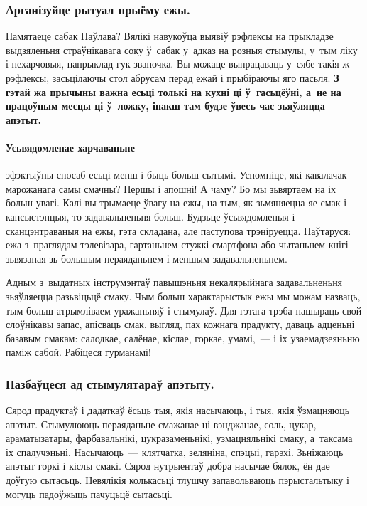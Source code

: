 \subsubsection{Арганізуйце рытуал прыёму ежы.}
Памятаеце сабак Паўлава? Вялікі навукоўца выявіў рэфлексы на прыкладзе выдзяленьня страўнікавага соку ў~сабак у~адказ на розныя стымулы, у~тым ліку і нехарчовыя, напрыклад гук званочка. Вы можаце выпрацаваць у~сябе такія ж рэфлексы, засьцілаючы стол абрусам перад ежай і прыбіраючы яго пасьля. \textbf{З гэтай жа прычыны важна есьці толькі на кухні ці ў~гасьцёўні, а~не на працоўным месцы ці ў~ложку, інакш там будзе ўвесь час зьяўляцца апэтыт.}

\paragraph{Усьвядомленае харчаваньне~---} эфэктыўны спосаб есьці менш і быць больш сытымі. Успомніце, які кавалачак марожанага самы смачны? Першы і апошні! А чаму? Бо мы зьвяртаем на іх больш увагі. Калі вы трымаеце ўвагу на ежы, на тым, як зьмяняецца яе смак і кансыстэнцыя, то задавальненьня больш. Будзьце ўсьвядомленыя і сканцэнтраваныя на ежы, гэта складана, але паступова трэніруецца. Паўтаруся: ежа з~праглядам тэлевізара, гартаньнем стужкі смартфона або чытаньнем кнігі зьвязаная зь большым пераяданьнем і меншым задавальненьнем.


Адным з~выдатных інструмэнтаў павышэньня некалярыйнага задавальненьня зьяўляецца разьвіцьцё смаку. Чым больш характарыстык ежы мы можам назваць, тым больш атрымліваем уражаньняў і стымулаў. Для гэтага трэба пашыраць свой слоўнікавы запас, апісваць смак, выгляд, пах кожнага прадукту, даваць адценьні базавым смакам: салодкае, салёнае, кіслае, горкае, умамі,~--- і іх узаемадзеяньню паміж сабой. Рабіцеся гурманамі!

\subsubsection{Пазбаўцеся ад стымулятараў апэтыту.}
Сярод прадуктаў і дадаткаў ёсьць тыя, якія насычаюць, і тыя, якія ўзмацняюць апэтыт. Стымулююць пераяданьне смажанае ці вэнджанае, соль, цукар, араматызатары, фарбавальнікі, цукразаменьнікі, узмацняльнікі смаку, а~таксама іх спалучэньні. Насычаюць~--- клятчатка, зеляніна, спэцыі, гарэхі. Зьніжаюць апэтыт горкі і кіслы смакі. Сярод нутрыентаў добра насычае бялок, ён дае доўгую сытасьць. Невялікія колькасьці тлушчу запавольваюць пэрыстальтыку і могуць падоўжыць пачуцьцё сытасьці.

